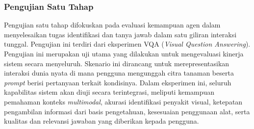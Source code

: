 \subsubsection{Pengujian Satu Tahap}
Pengujian satu tahap difokuskan pada evaluasi kemampuan agen dalam menyelesaikan tugas identifikasi dan tanya jawab dalam satu giliran interaksi tunggal. Pengujian ini terdiri dari eksperimen VQA (\textit{Visual Question Answering}). Pengujian ini merupakan uji utama yang dilakukan untuk mengevaluasi kinerja sistem secara menyeluruh. Skenario ini dirancang untuk merepresentasikan interaksi dunia nyata di mana pengguna mengunggah citra tanaman beserta \textit{prompt} berisi pertanyaan terkait kondisinya. Dalam eksperimen ini, seluruh kapabilitas sistem akan diuji secara terintegrasi, meliputi kemampuan pemahaman konteks \textit{multimodal}, akurasi identifikasi penyakit visual, ketepatan pengambilan informasi dari basis pengetahuan, kesesuaian penggunaan alat, serta kualitas dan relevansi jawaban yang diberikan kepada pengguna.

